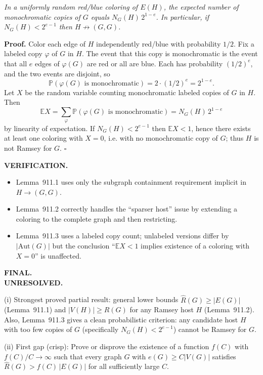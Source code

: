 \emph{In a uniformly random red/blue coloring of $E(H)$, the expected number of monochromatic copies of $G$ equals $N_G(H)\,2^{1-e}$. In particular, if $N_G(H)<2^{e-1}$ then $H\not\to (G,G)$.}

\noindent\textbf{Proof.} Color each edge of $H$ independently red/blue with probability $1/2$. Fix a labeled copy $\varphi$ of $G$ in $H$. The event that this copy is monochromatic is the event that all $e$ edges of $\varphi(G)$ are red or all are blue. Each has probability $(1/2)^e$, and the two events are disjoint, so
\[\mathbb{P}(\varphi(G)\text{ is monochromatic}) = 2\cdot (1/2)^e = 2^{1-e}.
\]
Let $X$ be the random variable counting monochromatic labeled copies of $G$ in $H$. Then
\[\mathbb{E}X = \sum_{\varphi} \mathbb{P}(\varphi(G)\text{ is monochromatic}) = N_G(H)\,2^{1-e}
\]
by linearity of expectation. If $N_G(H)<2^{e-1}$ then $\mathbb{E}X<1$, hence there exists at least one coloring with $X=0$, i.e. with no monochromatic copy of $G$; thus $H$ is not Ramsey for $G$. \hfill$\square$

\medskip
\noindent\textbf{VERIFICATION.}\\
\begin{itemize}
\item Lemma~911.1 uses only the subgraph containment requirement implicit in $H\to (G,G)$.
\item Lemma~911.2 correctly handles the ``sparser host'' issue by extending a coloring to the complete graph and then restricting.
\item Lemma~911.3 uses a labeled copy count; unlabeled versions differ by $|\mathrm{Aut}(G)|$ but the conclusion ``$\mathbb{E}X<1$ implies existence of a coloring with $X=0$'' is unaffected.
\end{itemize}

\medskip
\noindent\textbf{FINAL.}\\
\textbf{UNRESOLVED.}

(i) Strongest proved partial result: general lower bounds $\hat R(G)\ge |E(G)|$ (Lemma~911.1) and $|V(H)|\ge R(G)$ for any Ramsey host $H$ (Lemma~911.2). Also, Lemma~911.3 gives a clean probabilistic criterion: any candidate host $H$ with too few copies of $G$ (specifically $N_G(H)<2^{e-1}$) cannot be Ramsey for $G$.

(ii) First gap (crisp): Prove or disprove the existence of a function $f(C)$ with $f(C)/C\to\infty$ such that every graph $G$ with $e(G)\ge C|V(G)|$ satisfies $\hat R(G) > f(C)\,|E(G)|$ for all sufficiently large $C$.

